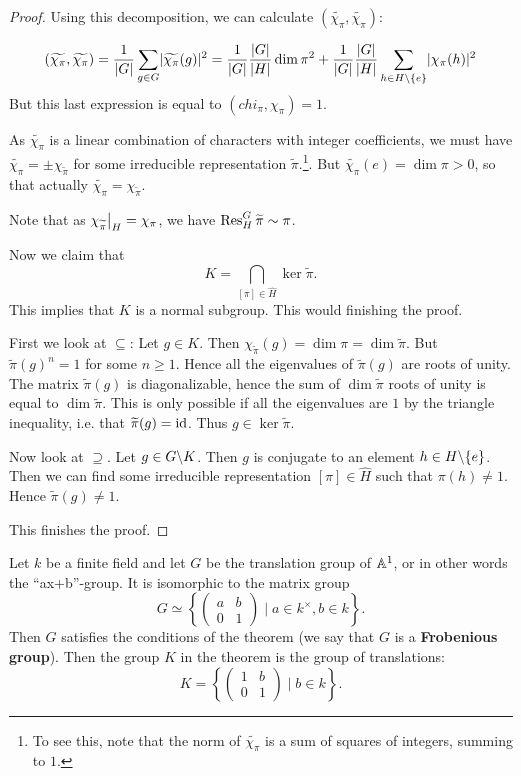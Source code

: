 \documentclass[11pt, english]{article}
\begin{document}
\begin{proof}
Using this decomposition, we can calculate $(\widetilde{\chi_\pi},\widetilde{\chi_\pi})$:

$$
(\widetilde{\chi_\pi},\widetilde{\chi_\pi}) = \frac{1}{\lvert G \rvert} \sum_{g \in G} \lvert \widetilde{\chi_\pi}(g) \rvert^2 = \frac{1}{\lvert G \rvert} \frac{\lvert G \rvert }{\lvert H \rvert } \dim \pi^2 + \frac{1}{\lvert G \rvert} \frac{\lvert G \rvert }{\lvert H \rvert} \sum_{h \in H\backslash \{e\} } \lvert \chi_\pi(h) \rvert^2
$$
But this last expression is equal to $(chi_\pi,\chi_\pi)=1$.

As $\widetilde{\chi_\pi}$ is a linear combination of characters with integer coefficients, we must have $\widetilde{\chi_\pi} = \pm \chi_{\widetilde \pi}$ for some irreducible representation $\widetilde \pi$.\footnote{To see this, note that the norm of $\widetilde{\chi_\pi}$ is a sum of squares of integers, summing to $1$.}. But $\widetilde{\chi_\pi}(e) = \dim \pi > 0$, so that actually $\widetilde{\chi_\pi} = \chi_{\widetilde \pi}$. 

Note that as $\restr{\chi_{\widetilde \pi}}{H} = \chi_\pi$, we have $\operatorname{Res}_H^G \widetilde \pi \sim \pi$.

Now we claim that
$$
K = \bigcap_{[\pi] \in \hat H} \ker \widetilde \pi.
$$
This implies that $K$ is a normal subgroup. This would finishing the proof.

First we look at $\subseteq$: Let $g \in K$. Then $\chi_{\widetilde \pi}(g) = \dim \pi = \dim \widetilde \pi$. But $\widetilde \pi(g)^n = 1$ for some $n \geq 1$. Hence all the eigenvalues of $\widetilde \pi (g)$ are roots of unity. The matrix $\widetilde \pi(g)$ is diagonalizable, hence the sum of $\dim \widetilde \pi$ roots of unity is equal to $\dim \widetilde \pi$. This is only possible if all the eigenvalues are $1$ by the triangle inequality, i.e. that $\widetilde \pi(g)=\text{id}$. Thus $g \in \ker \widetilde \pi$.

Now look at $\supseteq$. Let $g \in G \backslash K$. Then $g$ is conjugate to an element $h \in H \backslash \{e\}$. Then we can find some irreducible representation $[\pi] \in \hat H$ such that $\pi(h) \neq 1$. Hence $\widetilde \pi(g) \neq 1$. 

This finishes the proof.
\end{proof}

\begin{example}
Let $k$ be a finite field and let $G$ be the translation group of $\mathbb{A}^1$, or in other words the ``ax+b''-group. It is isomorphic to the matrix group
$$
G \simeq \left\{ \begin{pmatrix}
a & b \\
0 & 1 
\end{pmatrix} \mid a \in k^\times, b \in k \right\}.
$$
Then $G$ satisfies the conditions of the theorem (we say that $G$ is a \textbf{Frobenious group}). Then the group $K$ in the theorem is the group of translations:
$$
K = \left\{ \begin{pmatrix}
1 & b \\ 0 & 1 
\end{pmatrix}
\mid b \in k \right \}.
$$
\end{example}
\end{document}
